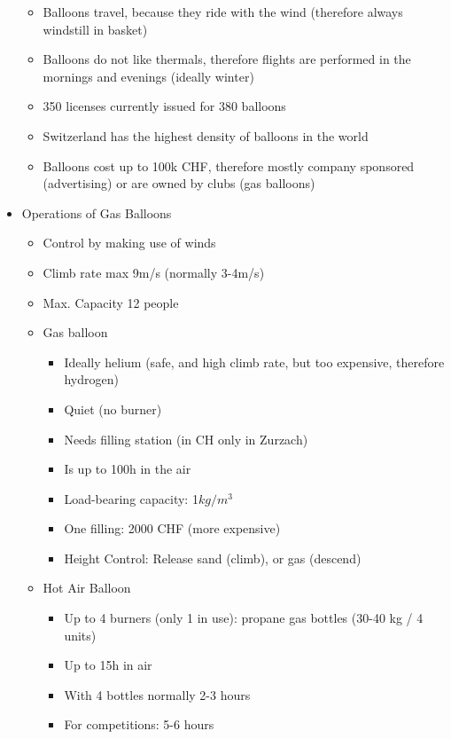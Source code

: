 \documentclass[9pt, landscape, fleqn]{scrartcl}
\begin{document}
\begin{multicols*}{3}
\begin{itemize}
    \begin{itemize}
        \item Balloons travel, because they ride with the wind (therefore always windstill in basket)
        \item Balloons do not like thermals, therefore flights are performed in the mornings and evenings (ideally winter)
        \item 350 licenses currently issued for 380 balloons 
        \item Switzerland has the highest density of balloons in the world 
        \item Balloons cost up to 100k CHF, therefore mostly company sponsored (advertising) or are owned by clubs (gas balloons)
    \end{itemize}
   \item Operations of Gas Balloons
   \begin{itemize}
       \item Control by making use of winds 
       \item Climb rate max 9m/s (normally 3-4m/s)
       \item Max. Capacity 12 people 
       \item Gas balloon 
       \begin{itemize}
           \item Ideally helium (safe, and high climb rate, but too expensive, therefore hydrogen)
           \item Quiet (no burner)
           \item Needs filling station (in CH only in Zurzach)
           \item Is up to 100h in the air 
           \item Load-bearing capacity: 1$kg/m^3$
           \item One filling: 2000 CHF (more expensive)
           \item Height Control: Release sand (climb), or gas (descend)
       \end{itemize}
       \item Hot Air Balloon 
       \begin{itemize}
           \item Up to 4 burners (only 1 in use): propane gas bottles (30-40 kg / 4 units)
           \item Up to 15h in air 
           \item With 4 bottles normally 2-3 hours 
           \item For competitions: 5-6 hours 

\end{itemize}
\end{itemize}
\end{itemize}
\end{multicols*}
\end{document}
